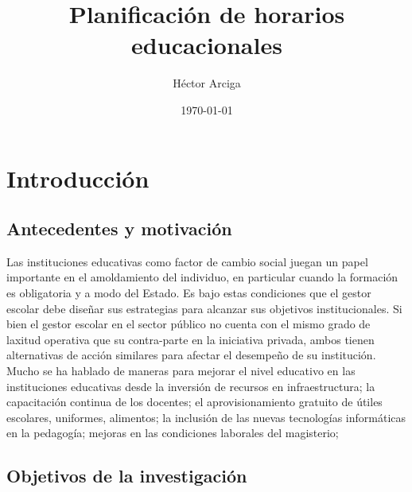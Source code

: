 \documentclass[draft,12pt,headsepline,footsepline,paper=letter]{scrreprt}
\begin{document}
\title{Planificación de horarios educacionales}
\author{Héctor Arciga}
\date{\today}

\maketitle

\begin{spacing}{1}
\tableofcontents
\glsaddall 
\printglossaries
\listoffigures
\listoftables
\end{spacing}


\chapter{Introducción}


\section{Antecedentes y motivación}

Las instituciones educativas como factor de cambio social juegan un papel importante en el amoldamiento del individuo, en particular cuando la formación es obligatoria y a modo del Estado. Es bajo estas condiciones que el gestor escolar debe diseñar sus estrategias para alcanzar sus objetivos institucionales. 
Si bien el gestor escolar en el sector público no cuenta con el mismo grado de laxitud operativa que su contra-parte en la iniciativa privada, ambos tienen alternativas de acción similares para afectar el desempeño de su institución.
Mucho se ha hablado de maneras para mejorar el nivel educativo en las instituciones educativas desde la inversión de recursos en infraestructura; la capacitación continua de los docentes; el aprovisionamiento gratuito de útiles escolares, uniformes, alimentos; la  inclusión de las nuevas tecnologías informáticas en la pedagogía; mejoras en las condiciones laborales del magisterio; 


\section{Objetivos de la investigación}
\end{document}

